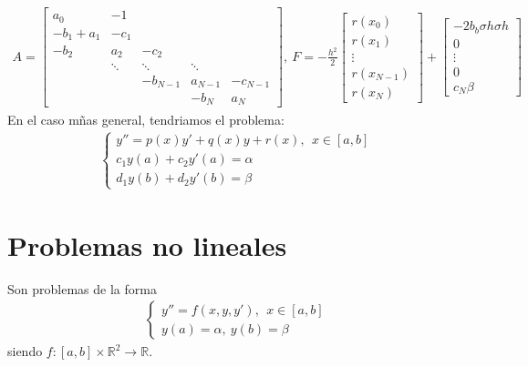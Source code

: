 \begin{align*}
     A = \begin{bmatrix}
a_0 & -1 & & & \\     
-b_1 +a_1 & -c_1 &  &  & \\
-b_2 & a_2 & -c_2 &  & \\
 & \ddots & \ddots & \ddots & \\
 &  & -b_{N-1} & a_{N-1} & -c_{N-1} \\
 &  &  & -b_N & a_N
\end{bmatrix}, \ F = -\frac{h^2}{2} \begin{bmatrix}
r(x_0)\\
r(x_1) \\
\vdots\\
r(x_{N-1}) \\
r(x_N)
\end{bmatrix} + \begin{bmatrix}
-2b_b\sigma h \sigma h\\
0 \\
\vdots\\
0 \\
c_N\beta
\end{bmatrix}
\end{align*}
En el caso mñas general, tendriamos el problema:
\begin{align*}
        \left\{ \begin{array}{lcc}
             y'' = p(x)y' + q(x)y + r(x), \ \ x \in [a,b]\\
             c_1y(a) + c_2y'(a) = \alpha \\
             d_1y(b) + d_2y'(b) = \beta
             \end{array}
   \right.
\end{align*}

\section{Problemas no lineales}
\noindent Son problemas de la forma
\begin{align*}
        \left\{ \begin{array}{lcc}
             y'' = f(x,y,y'), \ \ x \in [a,b]\\
             y(a) = \alpha, \ y(b) = \beta
             \end{array}
   \right.
\end{align*}
siendo $f: [a,b] \times \mathbb{R}^2 \longrightarrow \mathbb{R}$.

